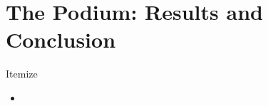 \documentclass[compress,aspectratio=169]{beamer}
\begin{document}
\section[Results]{The Podium: Results and Conclusion}

\begin{frame}{Itemize}
  \begin{itemize}
    \item
  \end{itemize}
\end{frame}
%
%
%
%
%
%
\end{document}
